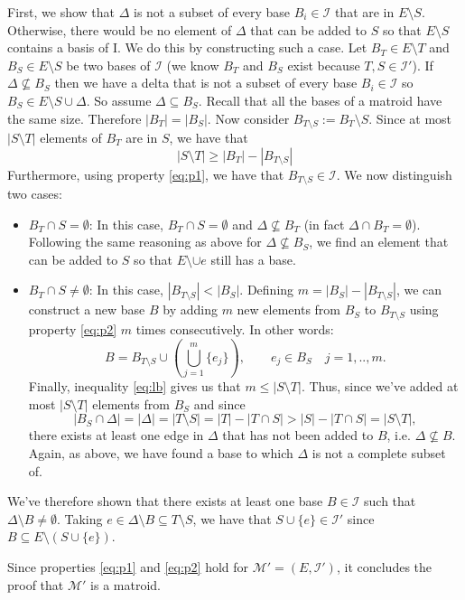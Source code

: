 \documentclass[10pt]{article}
\newenvironment{exercise}[2][Exercise]{\begin{trivlist}
  \item[\hskip \labelsep {\bfseries #1}\hskip \labelsep {\bfseries #2.}]}{\end{trivlist}}
\begin{document}
\begin{exercise}{2a}
\begin{enumerate}
First, we show that $\Delta$ is not a subset of every base $B_i \in \mathcal{I}$ that are in $E \setminus S$. Otherwise, there would be no element of $\Delta$ that can be added to $S$ so that $E\setminus S$ contains a basis of I. We do this by constructing such a case. \newline  
Let $B_T \in E \setminus T$ and $B_S \in E \setminus S$ be two bases of $\mathcal{I}$ (we know $B_T$ and $B_S$ exist because $T, S \in \mathcal{I}'$). If $\Delta \nsubseteq B_S$ then we have a delta that is not a subset of every base $B_i \in \mathcal{I}$ so $B_S \in E\setminus S \cup \Delta$. So assume $\Delta \subseteq B_S$. Recall that all the bases of a matroid have the same size. Therefore $|B_T| = |B_S|$. Now consider $B_{T\setminus S} := B_T \setminus S $. Since at most $|S\setminus T|$ elements of $B_T$ are in $S$, we have that 
\begin{equation}
 |S\setminus T| \geq |B_T| - |B_{T\setminus S}| \label{eq:lb}
\end{equation} 
Furthermore, using property \eqref{eq:p1}, we have that $B_{T\setminus S} \in \mathcal{I}$. We now distinguish two cases:
\begin{itemize}
\item $B_T \cap S = \emptyset$: In this case,  $B_T \cap S = \emptyset$ and $\Delta \nsubseteq B_T$ (in fact $\Delta \cap B_T = \emptyset$). Following the same reasoning as above for $\Delta \nsubseteq B_S$, we find an element that can be added to $S$ so that $E\setminus \cup{e}$ still has a base. 
\item $B_T \cap S \neq \emptyset$: In this case, $|B_{T\setminus S}| < |B_S|$. Defining $m = |B_S|-|B_{T\setminus S}|$, we can  construct a new base $B$ by adding $m$ new elements from $B_S$ to $B_{T\setminus S}$ using property \eqref{eq:p2} $m$ times consecutively. In other words:
\begin{equation}
B = B_{T\setminus S}  \cup \left(\bigcup_{j=1}^{m}\{e_j\}\right), \qquad e_j \in B_S \quad j = 1,..,m.
\end{equation}
 Finally, inequality \eqref{eq:lb} gives us that $m \leq |S \setminus T|$. Thus, since we've added at most $|S \setminus T|$ elements from $B_S$ and since
 \begin{displaymath}
  |B_S \cap \Delta| = |\Delta|=|T \setminus S| = |T| - |T\cap S|>  |S| - |T\cap S| = |S \setminus T|,
  \end{displaymath}
  there exists at least one edge in $\Delta$ that has not been added to $B$, i.e. $\Delta \nsubseteq B$. Again, as above, we have found a base to which $\Delta$ is not a complete subset of. 
\end{itemize}
We've therefore shown that there exists at least one base $B \in \mathcal{I}$ such that $\Delta \setminus B \neq \emptyset$.  Taking $e \in \Delta \setminus B \subseteq T\setminus S$, we have that $S \cup \{e\} \in \mathcal{I}'$ since $B \subseteq E\setminus (S \cup \{e\})$.
\end{enumerate}
 Since properties \eqref{eq:p1} and \eqref{eq:p2} hold for $\mathcal{M}'=(E,\mathcal{I}')$, it concludes the proof that $\mathcal{M}'$ is a matroid.
  \end{exercise}
  
\end{document}
